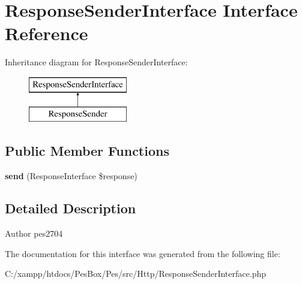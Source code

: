 \hypertarget{interface_pes_1_1_http_1_1_response_sender_interface}{}\section{Response\+Sender\+Interface Interface Reference}
\label{interface_pes_1_1_http_1_1_response_sender_interface}
Inheritance diagram for Response\+Sender\+Interface\+:\begin{figure}[H]
\begin{center}
\leavevmode
\includegraphics[height=2.000000cm]{interface_pes_1_1_http_1_1_response_sender_interface}
\end{center}
\end{figure}
\subsection*{Public Member Functions}
\begin{DoxyCompactItemize}
\item 
\mbox{\label{interface_pes_1_1_http_1_1_response_sender_interface_ac839c15946f979e4e1d19325d3b69ee0}} 
{\bfseries send} (Response\+Interface \$response)
\end{DoxyCompactItemize}


\subsection{Detailed Description}
\begin{DoxyAuthor}{Author}
pes2704 
\end{DoxyAuthor}


The documentation for this interface was generated from the following file\+:\begin{DoxyCompactItemize}
\item 
C\+:/xampp/htdocs/\+Pes\+Box/\+Pes/src/\+Http/Response\+Sender\+Interface.\+php\end{DoxyCompactItemize}
